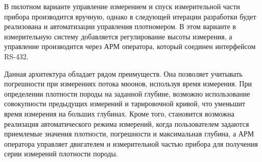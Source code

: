 В пилотном варианте управление измерением и спуск измерительной части прибора производится вручную, однако в следующей итерации разработки будет реализована и автоматизации управления плотномером. В этом варианте в измерительную систему добавляется регулирование высоты измерения, а управление производится через АРМ оператора, который соединен интерфейсом RS-432.

Данная архитектура обладает рядом преимуществ. Она позволяет учитывать погрешности при измерениях потока мюонов, используя время измерения. 
При определении плотности породы на заданной глубине, возможно использование совокупности предыдущих измерений и тарировочной кривой, что уменьшит время измерения на больших глубинах.
Кроме того, становится возможна реализация автоматического режима измерений, когда пользователем задаются приемлемые значения плотности, погрешности и максимальная глубина, а АРМ оператора управляет двигателем и измерительной частью прибора для получения серии измерений плотности породы. 

% 



\clearpage
